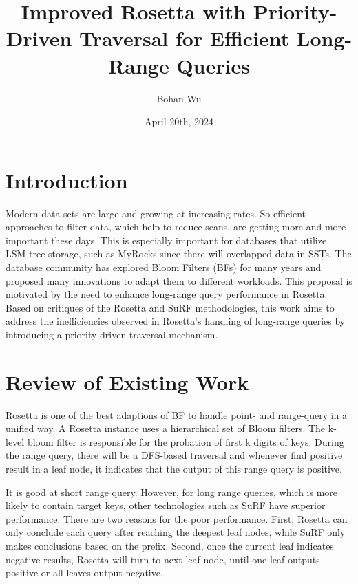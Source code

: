 \documentclass[12pt, letterpaper]{article}
\title{Improved Rosetta with Priority-Driven Traversal for Efficient Long-Range Queries}
\author{Bohan Wu}
\date{April 20th, 2024}
\begin{document}
\maketitle

\section{Introduction}
Modern data sets are large and growing at increasing rates. So efficient approaches to filter data, which help to reduce scans, are getting more and more important these days. This is especially important for databases that utilize LSM-tree storage, such as MyRocks\cite{matsunobu2020myrocks} since there will overlapped data in SSTs. The database community has explored Bloom Filters (BFs) for many years and proposed many innovations to adapt them to different workloads. This proposal is motivated by the need to enhance long-range query performance in Rosetta\cite{luo2020rosetta}. Based on critiques of the Rosetta and SuRF\cite{zhang2018surf} methodologies, this work aims to address the inefficiencies observed in Rosetta’s handling of long-range queries by introducing a priority-driven traversal mechanism.

\section{Review of Existing Work}
Rosetta is one of the best adaptions of BF to handle point- and range-query in a unified way. A Rosetta instance uses a hierarchical set of Bloom filters. The k-level bloom filter is responsible for the probation of first k digits of keys.  During the range query, there will be a DFS-based traversal and whenever find positive result in a leaf node, it indicates that the output of this range query is positive.   

It is good at short range query. However, for long range queries, which is more likely to contain target keys, other technologies such as SuRF have superior performance. There are two reasons for the poor performance. First, Rosetta can only conclude each query after reaching the deepest leaf nodes, while SuRF only makes conclusions based on the prefix. Second, once the current leaf indicates negative results, Rosetta will turn to next leaf node, until one leaf outputs positive or all leaves output negative. 
\end{document}
